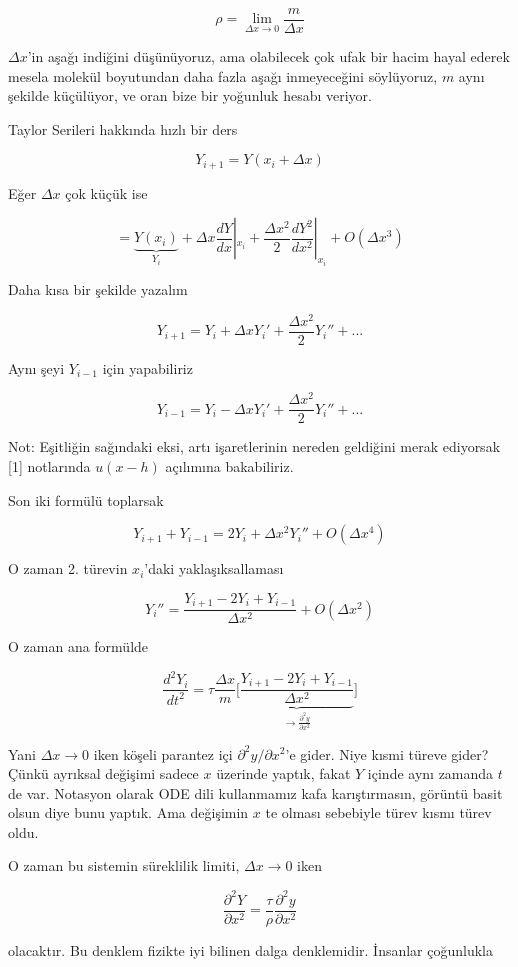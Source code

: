 \documentclass[12pt,fleqn]{article}\usepackage{../../common}
\begin{document}
$$ \rho = \lim_{\Delta x \to 0} \frac{m}{\Delta x} $$

$\Delta x$'in aşağı indiğini düşünüyoruz, ama olabilecek çok ufak bir hacim
hayal ederek mesela molekül boyutundan daha fazla aşağı inmeyeceğini
söylüyoruz, $m$ aynı şekilde küçülüyor, ve oran bize bir yoğunluk hesabı
veriyor.

Taylor Serileri hakkında hızlı bir ders

$$ Y_{i+1}=Y(x_i + \Delta x) $$

Eğer $\Delta x$ çok küçük ise

$$ = 
\underbrace{Y(x_i)}_{Y_i} + \Delta x \frac{dY}{dx}|_{x_i} + 
\frac{\Delta x^2}{2}\frac{dY^2}{dx^2}|_{x_i} + 
O(\Delta x^3)
$$

Daha kısa bir şekilde yazalım

$$ Y_{i+1} = Y_i + \Delta x Y_i' + \frac{\Delta x^2}{2}Y_i'' + ... 
$$

Aynı şeyi $Y_{i-1}$ için yapabiliriz

$$ Y_{i-1} = Y_i - \Delta x Y_i' + \frac{\Delta x^2}{2}Y_i'' + ... 
$$

Not: Eşitliğin sağındaki eksi, artı işaretlerinin nereden geldiğini merak
ediyorsak [1] notlarında $u(x-h)$ açılımına
bakabiliriz.

Son iki formülü toplarsak

$$ Y_{i+1} + Y_{i-1} = 2Y_i + \Delta x^2 Y_i''  + O(\Delta x^4)$$

O zaman 2. türevin $x_i$'daki yaklaşıksallaması 

$$ Y_i'' = \frac{Y_{i+1} - 2Y_i + Y_{i-1}}{\Delta x^2} + O(\Delta x^2) $$

O zaman ana formülde

$$ \frac{d^2Y_i}{dt^2} = 
\tau \frac{\Delta x}{m} \bigg[\underbrace{
\frac{Y_{i+1} - 2Y_i + Y_{i-1}}{\Delta x^2}
}_{\to \frac{\partial ^2y}{\partial x^2}}
\bigg]
$$

Yani $\Delta x \to 0$ iken köşeli parantez içi $\partial ^2y/\partial x^2$'e
gider. Niye kısmi türeve gider? Çünkü ayrıksal değişimi sadece $x$ üzerinde
yaptık, fakat $Y$ içinde aynı zamanda $t$ de var. Notasyon olarak ODE dili
kullanmamız kafa karıştırmasın, görüntü basit olsun diye bunu yaptık. Ama
değişimin $x$ te olması sebebiyle türev kısmı türev oldu.

O zaman bu sistemin süreklilik limiti, $\Delta x \to 0$ iken

$$ 
\frac{\partial ^2Y}{\partial x^2} = 
\frac{\tau}{\rho}\frac{\partial ^2y}{\partial x^2}
 $$

olacaktır. Bu denklem fizikte iyi bilinen dalga denklemidir. İnsanlar
çoğunlukla 
\end{document}
